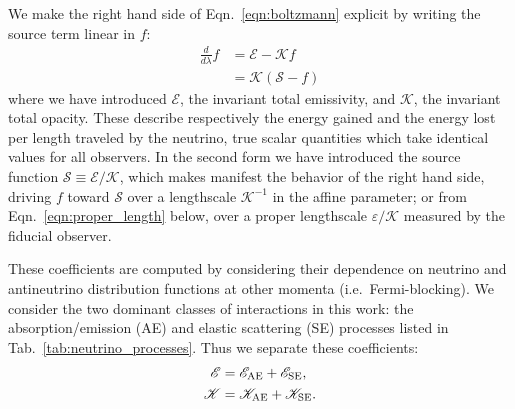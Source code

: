 \documentclass[aps,floatfix,prd,superscriptaddress,twocolumn]{revtex4-1}
\begin{document}
We make the right hand side of Eqn.~\ref{eqn:boltzmann} explicit by writing
the source term linear in $f$:
\begin{align}
  \label{eqn:boltzmann_linear}
  \frac{d}{d\lambda}f &=
  \mathscr{E} - \mathscr{K} f \\
  \label{eqn:boltzmann_linear_s}
  &= \mathscr{K}(\mathscr{S}-f)
\end{align}
where we have introduced
$\mathscr{E}$, the invariant total emissivity, and
$\mathscr{K}$, the invariant total opacity.
These describe respectively the energy gained and the energy lost
per length traveled by the neutrino, true scalar quantities
which take identical values for all observers.
In the second form we have introduced the source function
$\mathscr{S}\equiv\mathscr{E}/\mathscr{K}$, which makes manifest the
behavior of the right hand side, driving $f$ toward $\mathscr{S}$
over a lengthscale $\mathscr{K}^{-1}$ in the affine parameter;
or from Eqn.~\ref{eqn:proper_length} below, over a proper lengthscale
$\varepsilon/\mathscr{K}$ measured by the fiducial observer.

These coefficients are computed by considering their dependence
on neutrino and antineutrino distribution functions at other momenta
(i.e.\ Fermi-blocking).
We consider the two dominant classes of interactions in this work:
the absorption/emission (AE) and elastic scattering (SE) processes
listed in Tab.~\ref{tab:neutrino_processes}.
Thus we separate these coefficients:
\begin{align}
  \label{eqn:inv_emissivity_components}
  \mathscr{E} &= \mathscr{E}_{\rm AE} + \mathscr{E}_{\rm SE},\\
  \label{eqn:inv_opacity_components}
  \mathscr{K} &= \mathscr{K}_{\rm AE} + \mathscr{K}_{\rm SE}.
\end{align}
\end{document}
